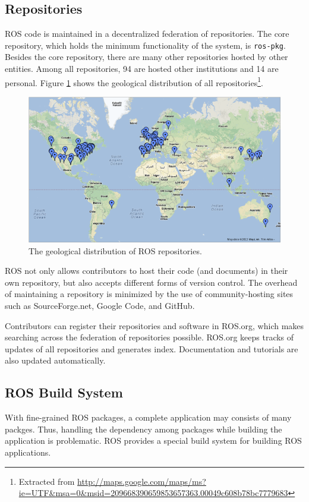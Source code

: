 \documentclass[a4paper, 10pt, conference]{ieeeconf}       %
\begin{document}
\subsection{Repositories}

ROS code is maintained in a decentralized federation of repositories. The core repository, which holds the minimum functionality of the system, is \texttt{ros-pkg}. Besides the core repository, there are many other repositories hosted by other entities. Among all repositories, 94 are hosted other institutions and 14 are personal. Figure \ref{fig:repos} shows the geological distribution of all repositories\footnote{Extracted from \url{http://maps.google.com/maps/ms?ie=UTF\&msa=0\&msid=209668390659853657363.00049c608b78bc7779683}}.

\begin{figure}[tbhp]
  \centering
  \includegraphics[width=.48\textwidth]{repos}
  \caption{The geological distribution of ROS repositories.}
  \label{fig:repos}
\end{figure}

ROS not only allows contributors to host their code (and documents) in their own repository, but also accepts different forms of version control. The overhead of maintaining a repository is minimized by the use of community-hosting sites such as SourceForge.net, Google
Code, and GitHub.

Contributors can register their repositories and software in ROS.org, which makes searching across the federation of repositories possible. ROS.org keeps tracks of updates of all repositories and generates index. Documentation and tutorials are also updated automatically.

\subsection{ROS Build System}

With fine-grained ROS packages, a complete application may consists of many packges. Thus, handling the dependency among packages while building the application is problematic. ROS provides a special build system for building ROS applications.
\end{document}
